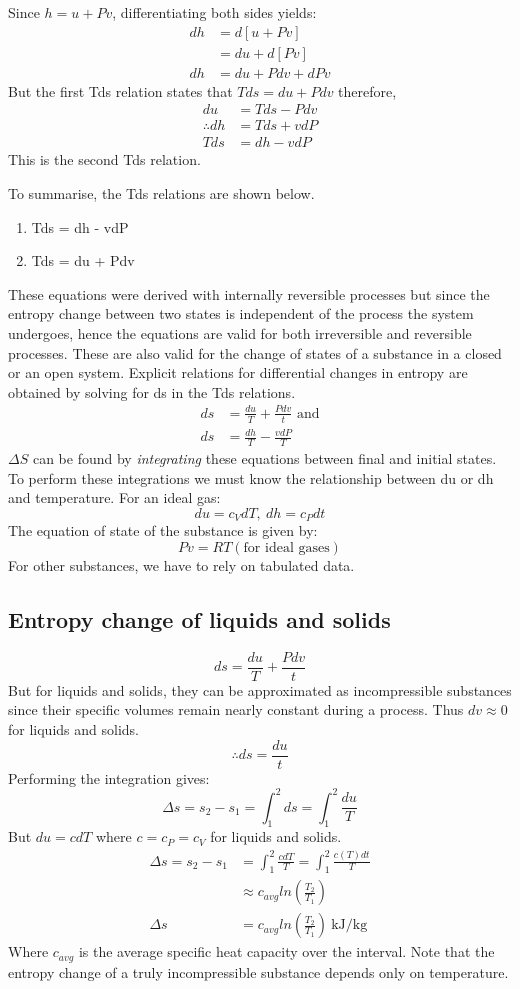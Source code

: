 \documentclass[class=report, crop=false, 12pt,a4paper]{standalone}
\begin{document}
Since \( h = u + Pv \), differentiating both sides yields:
\begin{align*}
  dh &= d[u+Pv]\\
  &= du + d[Pv]\\
  dh &= du + Pdv + dPv
\end{align*}
But the first Tds relation states that \(Tds = du + Pdv\) therefore, 
\begin{align*}
  du &= Tds - Pdv\\
  \therefore dh &= Tds + vdP\\
  Tds &= dh - vdP
\end{align*}
This is the second Tds relation.

To summarise, the Tds relations are shown below.
\begin{enumerate}[noitemsep]
  \item Tds = dh - vdP
  \item Tds = du + Pdv
\end{enumerate}
These equations were derived with internally reversible processes but since the entropy change between two states is independent of the process the system undergoes, hence the equations are valid for both irreversible and reversible processes. These are also valid for the change of states of a substance in a closed or an open system. Explicit relations for differential changes in entropy are obtained by solving for ds in the Tds relations.
\begin{align*}
  ds &= \frac{du}{T} + \frac{Pdv}{t} \textrm{ and}\\
  ds &= \frac{dh}{T} - \frac{vdP}{T}
\end{align*}
\(\Delta S\) can be found by \emph{integrating} these equations between final and initial states. To perform these integrations we must know the relationship between du or dh and temperature. For an ideal gas:
\[ du = c_V dT, \ dh = c_P dt \]
The equation of state of the substance is given by:
\[ Pv = RT (\textrm{for ideal gases}) \]
For other substances, we have to rely on tabulated data.
\subsection{Entropy change of liquids and solids}
\[ ds = \frac{du}{T} + \frac{Pdv}{t} \]
But for liquids and solids, they can be approximated as incompressible substances since their specific volumes remain nearly constant during a process. Thus \(dv \approx 0 \) for liquids and solids.
\[ \therefore ds = \frac{du}{t}\]
Performing the integration gives:
\[ \Delta s = s_2 - s_1 = \int_1^2 ds = \int_1^2 \frac{du}{T} \]
But \(du = cdT\) where \( c = c_P = c_V\) for liquids and solids.
\begin{align*}
  \Delta s = s_2 - s_1 &= \int_1^2 \frac{cdT}{T} = \int_1^2 \frac{c(T)dt}{T}\\
  &\approx c_{avg} ln(\frac{T_2}{T_1})\\
  \Delta s &= c_{avg} ln(\frac{T_2}{T_1}) \ \si{\kilo\joule\per\kg}
\end{align*}
Where \(c_{avg}\) is the average specific heat capacity over the interval. Note that the entropy change of a truly incompressible substance depends only on temperature.
\end{document}
